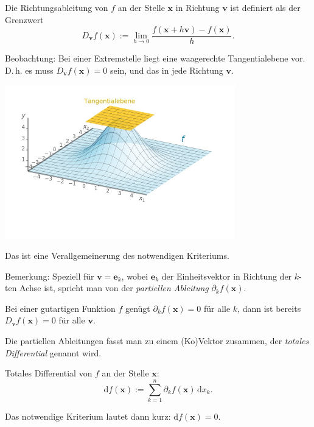 \documentclass{beamer}
\begin{document}
\begin{frame}
\begin{Definition}
Die Richtungsableitung von $f$ an der Stelle $\mathbf x$ in
Richtung $\mathbf v$ ist definiert als der Grenzwert
\[D_{\mathbf v} f(\mathbf x) := \lim_{h\to 0}\frac{f(\mathbf x+h\mathbf v)-f(\mathbf x)}{h}.\]
\end{Definition}
\end{frame}

\begin{frame}[t]
\vspace{1em}
Beobachtung: Bei einer Extremstelle liegt eine waagerechte
Tangentialebene vor. D.\,h. es muss $D_{\mathbf v} f(\mathbf x)=0$
sein, und das in jede Richtung $\mathbf v$.\pause

\begin{center}
\includegraphics[width=100mm]{img/Maximum2.jpg}
\end{center}
\end{frame}

\begin{frame}
Das ist eine Verallgemeinerung des notwendigen Kriteriums.
\pause

\vspace{0.8em}
Bemerkung: Speziell für $\mathbf v = \mathbf e_k$, wobei
$\mathbf e_k$ der Einheitsvektor in Richtung der $k$-ten Achse ist,
spricht man von der \emph{partiellen Ableitung}
$\partial_k f(\mathbf x)$.
\pause

\vspace{0.8em}
Bei einer gutartigen Funktion $f$ genügt
$\partial_k f(\mathbf x)=0$ für alle $k$, dann ist bereits
$D_{\mathbf v}f(\mathbf x)=0$ für alle $\mathbf v$.
\end{frame}

\begin{frame}
Die partiellen Ableitungen fasst man zu einem (Ko)Vektor zusammen,
der \emph{totales Differential} genannt wird.\pause

\begin{Definition}
Totales Differential von $f$ an der Stelle $\mathbf x$:
\[\mathrm df(\mathbf x) := \sum_{k=1}^n \partial_k f(\mathbf x)\,\mathrm dx_k.\]
\end{Definition}
\pause

Das notwendige Kriterium lautet dann kurz: $\mathrm df(\mathbf x)=0$.
\end{frame}
\end{document}
